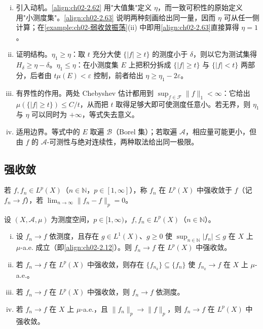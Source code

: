 \documentclass[../../main.tex]{subfiles}%
\begin{document}
\begin{remark}\label{remark:ch02-一致可积模等价}
\begin{enumerate}[(i)]
\item 引入动机。\eqref{align:ch02-2.62} 用"大值集"定义 $\eta$，而一致可积性的原始定义用"小测度集"。\eqref{align:ch02-2.63} 说明两种刻画给出同一量，因而 $\eta$ 可从任一侧计算；在\cref{example:ch02-弱收敛振荡}(ii) 中即用\eqref{align:ch02-2.63}直接算得 $\eta=1$。
\item 证明结构。$\eta_1\geqslant\eta$：取 $t$ 充分大使 $\{|f|\geqslant t\}$ 的测度小于 $\delta$，则以它为测试集得 $H_\delta\geqslant\eta-\delta$。$\eta_1\leqslant\eta$：在小测度集 $E$ 上把积分拆成 $\{|f|\geqslant t\}$ 与 $\{|f|<t\}$ 两部分，后者由 $t\mu(E)<\varepsilon$ 控制，前者给出 $\eta\geqslant\eta_1-2\varepsilon$。
\item 有界性的作用。两处 Chebyshev 估计都用到 $\sup_{f\in\mathscr F}\|f\|_1<\infty$：它给出 $\mu(\{|f|\geqslant t\})\leqslant C/t$，从而把 $t$ 取得足够大即可使测度任意小。若无界，则 $\eta_1$ 与 $\eta$ 可以同时为 $+\infty$，等式失去意义。
\item 适用边界。等式中的 $E$ 取遍 $\mathscr B$（Borel 集）；若取遍 $\mathscr A$，相应量可能更小，但由 $f$ 的 $\mathscr A$-可测性与绝对连续性，两种取法给出同一极限。
\end{enumerate}
\end{remark}

\subsection{强收敛}\label{subsection:ch02-强收敛}

若 $f,f_n\in L^p(X)$（$n\in\mathbb N$，$p\in[1,\infty]$），称 $f_n$ 在 $L^p(X)$ 中强收敛于 $f$（记 $f_n\to f$），若 $\lim_{n\to\infty}\|f_n-f\|_p=0$。

\begin{proposition}\label{proposition:ch02-强收敛性质}
设 $(X,\mathscr A,\mu)$ 为测度空间，$p\in[1,\infty)$，$f,f_n\in L^p(X)$（$n\in\mathbb N$）。
\begin{enumerate}[(i)]
\item 设 $f_n\to f$ 依测度，且存在 $g\in L^1(X)$、$g\geqslant0$ 使 $\sup_{n\in\mathbb N}|f_n|\leqslant g$ 在 $X$ 上 $\mu$-a.e. 成立（即\eqref{align:ch02-2.12}）。则 $f_n\to f$ 在 $L^p(X)$ 中强收敛。
\item 若 $f_n\to f$ 在 $L^p(X)$ 中强收敛，则存在 $\{f_{n_k}\}\subseteq\{f_n\}$ 使 $f_{n_k}\to f$ 在 $X$ 上 $\mu$-a.e.。
\item 若 $f_n\to f$ 在 $L^p(X)$ 中强收敛，则 $f_n\to f$ 依测度。
\item 若 $f_n\to f$ 在 $X$ 上 $\mu$-a.e.，且 $\|f_n\|_p\to\|f\|_p$，则 $f_n\to f$ 在 $L^p(X)$ 中强收敛。
\end{enumerate}
\end{proposition}
\end{document}
